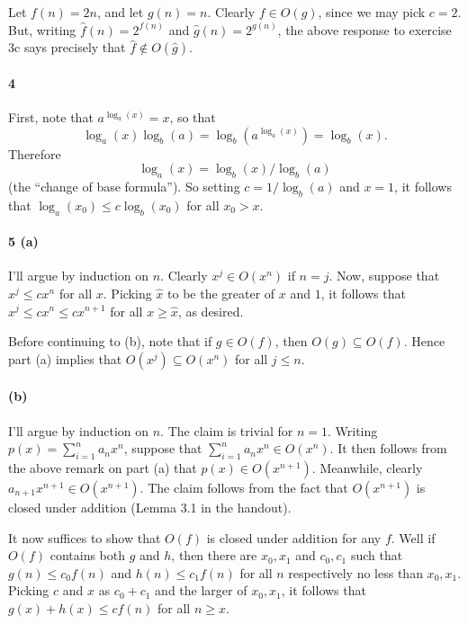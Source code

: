 \documentclass[
]{article}
\begin{document}
Let \(f(n) = 2n\), and let \(g(n) = n\). Clearly \(f\in O(g)\), since we
may pick \(c=2\). But, writing \(\hat f(n) = 2^{f(n)}\) and
\(\hat g(n) = 2^{g(n)}\), the above response to exercise 3c says
precisely that \(\hat f\not\in O(\hat g)\).

\hypertarget{section}{%
\paragraph{4}\label{section}}

First, note that \(a^{\log_a(x)} = x\), so that \begin{equation}
  \log_a(x)  \log_b(a) = \log_b(a^{\log_a(x)})  = \log_b(x).
\end{equation} Therefore \begin{equation}
  \log_a(x) = \log_b(x)/\log_b(a)
\end{equation} (the ``change of base formula''). So setting
\(c=1/\log_b(a)\) and \(x=1\), it follows that
\(\log_a(x_0)\leq c\log_b(x_0)\) for all \(x_0>x\).

\hypertarget{a-3}{%
\paragraph{5 (a)}\label{a-3}}

I'll argue by induction on \(n\). Clearly \(x^{j}\in O(x^n)\) if
\(n=j\). Now, suppose that \(x^j \leq cx^n\) for all \(x\). Picking
\(\hat x\) to be the greater of \(x\) and \(1\), it follows that
\(x^j \leq cx^n \leq c x^{n+1}\) for all \(x\geq \hat x\), as desired.

Before continuing to (b), note that if \(g\in O(f)\), then
\(O(g)\subseteq O(f)\). Hence part (a) implies that
\(O(x^j)\subseteq O(x^n)\) for all \(j\leq n\).

\hypertarget{b-3}{%
\paragraph{(b)}\label{b-3}}

I'll argue by induction on \(n\). The claim is trivial for \(n=1\).
Writing \(p(x) = \sum_{i=1}^{n}a_nx^n\), suppose that
\(\sum_{i=1}^{n}a_nx^n \in O(x^n)\). It then follows from the above
remark on part (a) that \(p(x) \in O(x^{n+1})\). Meanwhile, clearly
\(a_{n+1}x^{n+1} \in O(x^{n+1})\). The claim follows from the fact that
\(O(x^{n+1})\) is closed under addition (Lemma 3.1 in the handout).

It now suffices to show that \(O(f)\) is closed under addition for any
\(f\). Well if \(O(f)\) contains both \(g\) and \(h\), then there are
\(x_0, x_1\) and \(c_0, c_1\) such that \(g(n)\leq c_0f(n)\) and
\(h(n)\leq c_1f(n)\) for all \(n\) respectively no less than
\(x_0, x_1\). Picking \(c\) and \(x\) as \(c_0+c_1\) and the larger of
\(x_0, x_1\), it follows that \(g(x) + h(x) \leq cf(n)\) for all
\(n \geq x\).
\end{document}
